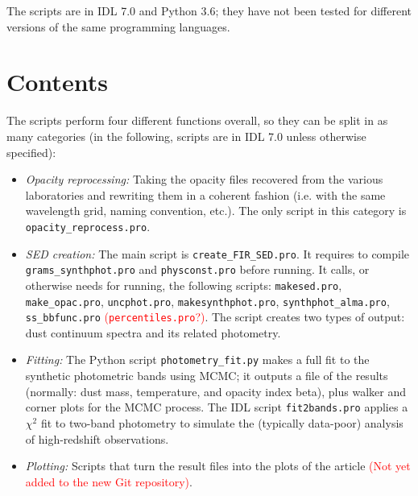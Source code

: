 \documentclass{article}
\begin{document}
The scripts are in IDL 7.0 and Python 3.6; they have not been tested for different versions of the same programming languages.


\section*{Contents}

The scripts perform four different functions overall, so they can be split in as many categories (in the following, scripts are in IDL 7.0 unless otherwise specified):
\begin{itemize}
\item {\it Opacity reprocessing:} Taking the opacity files recovered from the various laboratories and rewriting them in a coherent fashion (i.e. with the same wavelength grid, naming convention, etc.). The only script in this category is {\tt opacity\_reprocess.pro}.
\item {\it SED creation:} The main script is {\tt create\_FIR\_SED.pro}. It requires to compile {\tt grams\_synthphot.pro} and {\tt physconst.pro} before running. It calls, or otherwise needs for running, the following scripts: {\tt makesed.pro}, {\tt make\_opac.pro}, {\tt uncphot.pro}, {\tt makesynthphot.pro}, {\tt synthphot\_alma.pro}, {\tt ss\_bbfunc.pro} \textcolor{red}{({\tt percentiles.pro}?)}. The script creates two types of output: dust continuum spectra and its related photometry.
\item {\it Fitting:} The Python script {\tt photometry\_fit.py} makes a full fit to the synthetic photometric bands using MCMC; it outputs a file of the results (normally: dust mass, temperature, and opacity index beta), plus walker and corner plots for the MCMC process. The IDL script  {\tt fit2bands.pro} applies a $\chi^2$ fit to two-band photometry to simulate the (typically data-poor) analysis of high-redshift observations.
\item {\it Plotting:} Scripts that turn the result files into the plots of the article \textcolor{red}{(Not yet added to the new Git repository)}.
\end{itemize}
\end{document}
